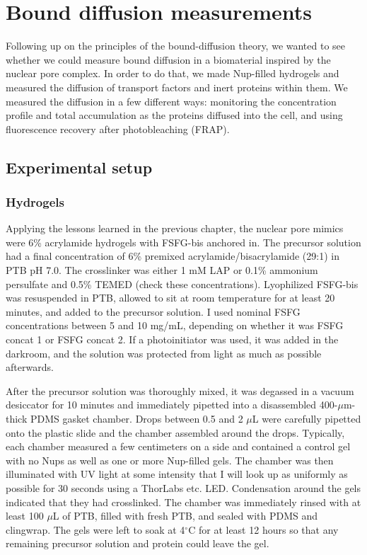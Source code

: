 \chapter{Bound diffusion measurements}\label{ch04}
\label{ch:bound-diffusion}

Following up on the principles of the bound-diffusion theory, we wanted to see whether we could measure bound diffusion in a biomaterial inspired by the nuclear pore complex.  In order to do that, we made Nup-filled hydrogels and measured the diffusion of transport factors and inert proteins within them.  We measured the diffusion in a few different ways: monitoring the concentration profile and total accumulation as the proteins diffused into the cell, and using fluorescence recovery after photobleaching (FRAP).
\section{Experimental setup}
\subsection{Hydrogels}
Applying the lessons learned in the previous chapter, the nuclear pore mimics were 6\% acrylamide hydrogels with FSFG-bis anchored in.  The precursor solution had a final concentration of 6\% premixed acrylamide/bisacrylamide (29:1) in PTB pH 7.0.  The crosslinker was either 1 mM LAP or 0.1\% ammonium persulfate and 0.5\% TEMED (check these concentrations).  Lyophilized FSFG-bis was resuspended in PTB, allowed to sit at room temperature for at least 20 minutes, and added to the precursor solution.  I used nominal FSFG concentrations between 5 and 10 mg/mL, depending on whether it was FSFG concat 1 or FSFG concat 2.  If a photoinitiator was used, it was added in the darkroom, and the solution was protected from light as much as possible afterwards.

After the precursor solution was thoroughly mixed, it was degassed in a vacuum desiccator for 10 minutes and immediately pipetted into a disassembled 400-$\mu$m-thick PDMS gasket chamber. Drops between 0.5 and 2 $\mu$L were carefully pipetted onto the plastic slide and the chamber assembled around the drops.  Typically, each chamber measured a few centimeters on a side and contained a control gel with no Nups as well as one or more Nup-filled gels.  The chamber was then illuminated with UV light at some intensity that I will look up as uniformly as possible for 30 seconds using a ThorLabs etc. LED.  Condensation around the gels indicated that they had crosslinked.  The chamber was immediately rinsed with at least 100 $\mu$L of PTB, filled with fresh PTB, and sealed with PDMS and clingwrap.  The gels were left to soak at 4$^\circ$C for at least 12 hours so that any remaining precursor solution and protein could leave the gel.

